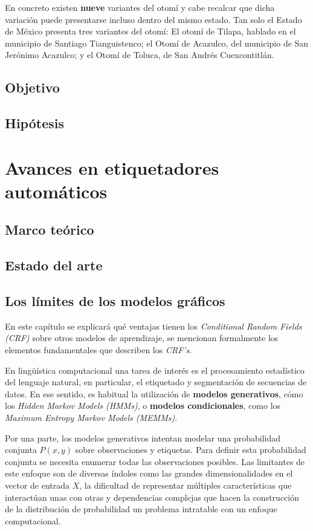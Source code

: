 \documentclass[letterpaper,12pt,oneside]{book}
\begin{document}
En concreto existen \textbf{nueve} variantes del otomí y cabe recalcar que dicha variación puede presentarse incluso dentro del mismo estado. Tan solo el Estado de México presenta tres variantes del otomí: El otomí de Tilapa, hablado en el municipio de Santiago Tianguistenco; el Otomí de Acazulco, del municipio de San Jerónimo Acazulco; y el Otomí de Toluca, de San Andrés Cuexcontitlán.

\section{Objetivo}

\section{Hipótesis}

\chapter{Avances en etiquetadores automáticos}

\section{Marco teórico}

\section{Estado del arte}

\section{Los límites de los modelos gráficos}

En este capítulo se explicará qué ventajas tienen los \emph{Conditional Random Fields (CRF)} sobre otros modelos de aprendizaje, se mencionan formalmente los elementos fundamentales que describen los \emph{CRF's}.

En lingüística computacional una tarea de interés es el procesamiento estadístico del lenguaje natural, en particular, el etiquetado y segmentación de secuencias de datos. En ese sentido, es habitual la utilización de \textbf{modelos generativos}, cómo los \textit{Hidden Markov Models (HMMs)}, o \textbf{modelos condicionales}, como los \textit{Maximum Entropy Markov Models (MEMMs)}.

Por una parte, los modelos generativos intentan modelar una probabilidad conjunta $P(x,y)$ sobre observaciones y etiquetas. Para definir esta probabilidad conjunta se necesita enumerar todas las observaciones posibles. Las limitantes de este enfoque son de diversas índoles como las grandes dimensionalidades en el vector de entrada $X$, la dificultad de representar múltiples características que interactúan unas con otras y dependencias complejas que hacen la construcción de la distribución de probabilidad un problema intratable con un enfoque computacional.
\end{document}
